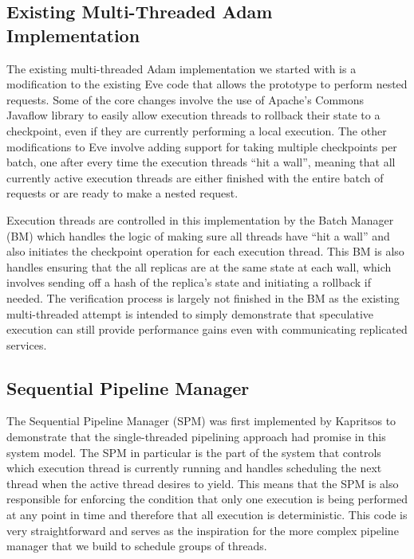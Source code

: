 \documentclass[11pt, oneside]{report}
\begin{document}
\subsection{Existing Multi-Threaded Adam Implementation}\label{BM}

The existing multi-threaded Adam implementation we started with is a modification to the existing Eve \cite{eve} code that allows the prototype to perform nested requests. 
Some of the core changes involve the use of Apache's Commons Javaflow library \cite{javaflow} to easily allow execution threads to rollback their state to a checkpoint, even if they are currently performing a local execution. 
The other modifications to Eve involve adding support for taking multiple checkpoints per batch, one after every time the execution threads ``hit a wall'', meaning that all currently active execution threads are either finished with the entire batch of requests or are ready to make a nested request.

Execution threads are controlled in this implementation by the Batch Manager (BM) which handles the logic of making sure all threads have ``hit a wall'' and also initiates the checkpoint operation for each execution thread. 
This BM is also handles ensuring that the all replicas are at the same state at each wall, which involves sending off a hash of the replica's state and initiating a rollback if needed. 
The verification process is largely not finished in the BM as the existing multi-threaded attempt is intended to simply demonstrate that speculative execution can still provide performance gains even with communicating replicated services.

\subsection{Sequential Pipeline Manager}\label{SPM}

The Sequential Pipeline Manager (SPM) was first implemented by Kapritsos to demonstrate that the single-threaded pipelining approach had promise in this system model. 
The SPM in particular is the part of the system that controls which execution thread is currently running and handles scheduling the next thread when the active thread desires to yield.
This means that the SPM is also responsible for enforcing the condition that only one execution is being performed at any point in time and therefore that all execution is deterministic.
This code is very straightforward and serves as the inspiration for the more complex pipeline manager that we build to schedule groups of threads.
\end{document}
